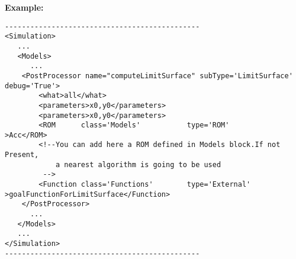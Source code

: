 \textbf{Example:}
\begin{lstlisting}[style=XML]
----------------------------------------------
<Simulation>
   ...
   <Models>
      ...
    <PostProcessor name="computeLimitSurface" subType='LimitSurface' debug='True'>
        <what>all</what>
        <parameters>x0,y0</parameters>
        <parameters>x0,y0</parameters>
        <ROM      class='Models'           type='ROM'             >Acc</ROM> 
        <!--You can add here a ROM defined in Models block.If not Present, 
            a nearest algorithm is going to be used
         -->
        <Function class='Functions'        type='External'        >goalFunctionForLimitSurface</Function>
    </PostProcessor>
      ...
   </Models>
   ...
</Simulation>
----------------------------------------------
\end{lstlisting}
